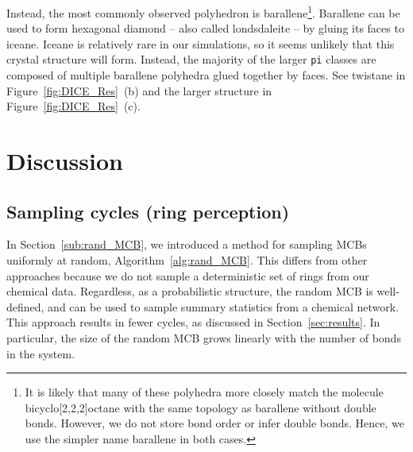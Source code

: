 \documentclass[fleqn,11pt]{article}
\begin{document}
Instead, the most commonly observed polyhedron is barallene\footnote{
	It is likely that many of these polyhedra more closely match the molecule bicyclo[2,2,2]octane with the same topology as barallene without double bonds. 
	However, we do not store bond order or infer double bonds. Hence, we use the simpler name barallene in both cases.
	}. %
Barallene can be used to form hexagonal diamond -- also called londsdaleite -- by gluing its faces to iceane. Iceane is relatively rare in our simulations, so it seems unlikely that this crystal structure will form. Instead, the majority of the larger {\tt pi} classes are composed of multiple barallene polyhedra glued together by faces. See twistane in Figure~\ref{fig:DICE_Res}~(b) and the larger structure in Figure~\ref{fig:DICE_Res}~(c).


\section{Discussion}
\label{sec:discussion}

\subsection{Sampling cycles (ring perception)} 
In Section~\ref{sub:rand_MCB}, we introduced a method for sampling MCBs uniformly at random, Algorithm~\ref{alg:rand_MCB}. 
This differs from other approaches because we do not sample a deterministic set of rings from our chemical data. 
Regardless, as a probabilistic structure, the random MCB is well-defined, and can be used to sample summary statistics from a chemical network. 
This approach results in fewer cycles, as discussed in Section~\ref{sec:results}. In particular, the size of the random MCB grows linearly with the number of bonds in the system.
\end{document}
